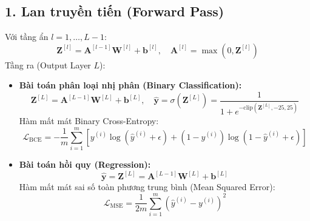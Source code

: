\documentclass[12pt,a4paper]{report}
\begin{document}
\subsection{1. Lan truyền tiến (Forward Pass)}
Với tầng ẩn $l = 1, \dots, L-1$:
\begin{equation}
    \mathbf{Z}^{[l]} = \mathbf{A}^{[l-1]} \mathbf{W}^{[l]} + \mathbf{b}^{[l]}, \quad \mathbf{A}^{[l]} = \max(0, \mathbf{Z}^{[l]})
\end{equation}
Tầng ra (Output Layer $L$):
\begin{itemize}
    \item \textbf{Bài toán phân loại nhị phân (Binary Classification):}
    \begin{equation}
        \mathbf{Z}^{[L]} = \mathbf{A}^{[L-1]} \mathbf{W}^{[L]} + \mathbf{b}^{[L]}, \quad \hat{\mathbf{y}} = \sigma(\mathbf{Z}^{[L]}) = \frac{1}{1 + e^{-\text{clip}(\mathbf{Z}^{[L]}, -25, 25)}}
    \end{equation}
    Hàm mất mát Binary Cross-Entropy:
    \begin{equation}
        \mathcal{L}_{\text{BCE}} = -\frac{1}{m} \sum_{i=1}^m \left[ y^{(i)} \log(\hat{y}^{(i)} + \epsilon) + (1 - y^{(i)}) \log(1 - \hat{y}^{(i)} + \epsilon) \right]
    \end{equation}
    \item \textbf{Bài toán hồi quy (Regression):}
    \begin{equation}
        \hat{\mathbf{y}} = \mathbf{Z}^{[L]} = \mathbf{A}^{[L-1]} \mathbf{W}^{[L]} + \mathbf{b}^{[L]}
    \end{equation}
    Hàm mất mát sai số toàn phương trung bình (Mean Squared Error):
    \begin{equation}
        \mathcal{L}_{\text{MSE}} = \frac{1}{2m} \sum_{i=1}^m \left( \hat{y}^{(i)} - y^{(i)} \right)^2
    \end{equation}
\end{itemize}
\end{document}
